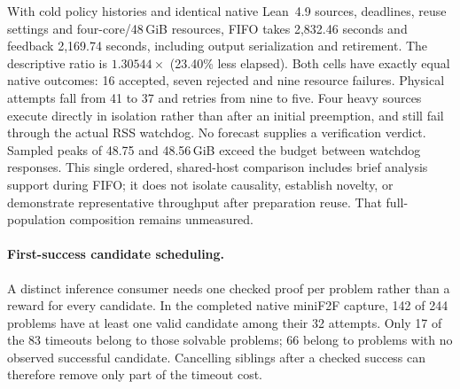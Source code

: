 \documentclass[10pt,twocolumn]{article}
\begin{document}
With cold policy histories and identical native Lean~4.9 sources, deadlines,
reuse settings and four-core/48\,GiB resources, FIFO takes 2,832.46 seconds
and feedback 2,169.74 seconds, including output serialization and retirement.
The descriptive ratio is $1.30544\times$ (23.40\% less elapsed).
Both cells have exactly equal native outcomes: 16 accepted, seven rejected and
nine resource failures. Physical attempts fall from 41 to 37 and retries from
nine to five. Four heavy sources execute directly in isolation rather than
after an initial preemption, and still fail through the actual RSS watchdog.
No forecast supplies a verification verdict. Sampled peaks of 48.75 and
48.56\,GiB exceed the budget between watchdog responses.
This single ordered, shared-host comparison includes brief analysis support
during FIFO; it does not isolate causality, establish novelty, or demonstrate
representative throughput after preparation reuse. That full-population
composition remains unmeasured.

\paragraph{First-success candidate scheduling.}
A distinct inference consumer needs one checked proof per problem rather than
a reward for every candidate. In the completed native miniF2F capture,
142 of 244 problems have at least one valid candidate among their 32 attempts.
Only 17 of the 83 timeouts belong to those solvable problems; 66 belong to
problems with no observed successful candidate. Cancelling siblings after a
checked success can therefore remove only part of the timeout cost.
\end{document}
